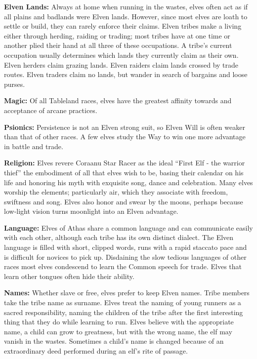 \textbf{Elven Lands:} Always at home when running in the wastes, elves often act as if all plains and badlands were Elven lands. However, since most elves are loath to settle or build, they can rarely enforce their claims. Elven tribes make a living either through herding, raiding or trading; most tribes have at one time or another plied their hand at all three of these occupations. A tribe's current occupation usually determines which lands they currently claim as their own. Elven herders claim grazing lands. Elven raiders claim lands crossed by trade routes. Elven traders claim no lands, but wander in search of bargains and loose purses.

\textbf{Magic:} Of all Tableland races, elves have the greatest affinity towards and acceptance of arcane practices.

\textbf{Psionics:} Persistence is not an Elven strong suit, so Elven Will is often weaker than that of other races. A few elves study the Way to win one more advantage in battle and trade.

\textbf{Religion:} Elves revere Coraanu Star Racer as the ideal ``First Elf - the warrior thief'' the embodiment of all that elves wish to be, basing their calendar on his life and honoring his myth with exquisite song, dance and celebration. Many elves worship the elements; particularly air, which they associate with freedom, swiftness and song. Elves also honor and swear by the moons, perhaps because low‐light vision turns moonlight into an Elven advantage.

\textbf{Language:} Elves of Athas share a common language and can communicate easily with each other, although each tribe has its own distinct dialect. The Elven language is filled with short, clipped words, runs with a rapid staccato pace and is difficult for novices to pick up. Disdaining the slow tedious languages of other races most elves condescend to learn the Common speech for trade. Elves that learn other tongues often hide their ability.

\textbf{Names:} Whether slave or free, elves prefer to keep Elven names. Tribe members take the tribe name as surname. Elves treat the naming of young runners as a sacred responsibility, naming the children of the tribe after the first interesting thing that they do while learning to run. Elves believe with the appropriate name, a child can grow to greatness, but with the wrong name, the elf may vanish in the wastes. Sometimes a child's name is changed because of an extraordinary deed performed during an elf's rite of passage.

